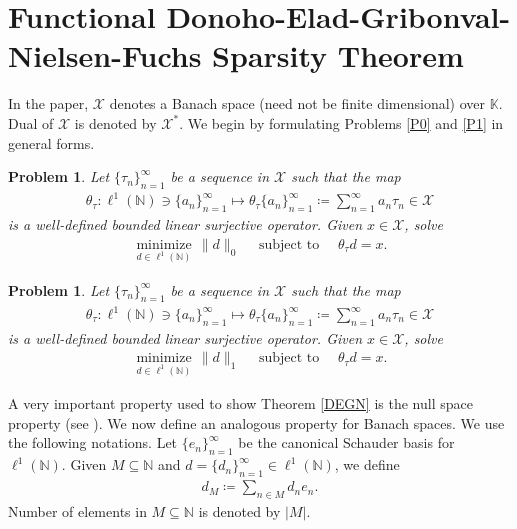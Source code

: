 \documentclass{amsart}
\newtheorem{problem}[theorem]{Problem}
\begin{document}
\section{Functional Donoho-Elad-Gribonval-Nielsen-Fuchs Sparsity Theorem}
In the paper,   $\mathcal{X}$ denotes a  Banach space (need not be finite dimensional) over $\mathbb{K}$. Dual of $\mathcal{X}$ is denoted by $\mathcal{X}^*$.
We begin by formulating  Problems \ref{P0} and \ref{P1} in general forms. 
\begin{problem} \label{BP0}
Let $\{\tau_n \}_{n=1}^\infty$ be a sequence in  $\mathcal{X}$ such that the map 
\begin{align*}
	\theta_\tau:\ell^1(\mathbb{N})\ni \{a_n \}_{n=1}^\infty\mapsto \theta_\tau \{a_n \}_{n=1}^\infty\coloneqq \sum_{n=1}^{\infty}a_n\tau_n \in \mathcal{X} 
\end{align*}
is a well-defined bounded linear surjective operator. Given $x \in \mathcal{X}$, solve 	
	\begin{align*}
	\underset{d\in \ell^1(\mathbb{N})}{\operatorname{minimize}}\,\|d\|_0 \quad \text{ subject to } \quad \theta_\tau d=x.
\end{align*}
\end{problem}
\begin{problem} \label{BP1}
	Let $\{\tau_n \}_{n=1}^\infty$ be a sequence in  $\mathcal{X}$ such that the map 
	\begin{align*}
		\theta_\tau:\ell^1(\mathbb{N})\ni \{a_n \}_{n=1}^\infty\mapsto \theta_\tau \{a_n \}_{n=1}^\infty\coloneqq \sum_{n=1}^{\infty}a_n\tau_n \in \mathcal{X} 
	\end{align*}
	is a well-defined bounded linear surjective operator. Given $x \in \mathcal{X}$, solve 	
	\begin{align*}
		\underset{d\in \ell^1(\mathbb{N})}{\operatorname{minimize}}\,\|d\|_1 \quad \text{ subject to } \quad \theta_\tau d=x.
	\end{align*}
\end{problem}
A very important property used to show Theorem \ref{DEGN} is the null space property (see \cite{KUTYNIOK, COHENDAHMENDEVORE}). We now define an analogous property for Banach spaces. We use the following notations. Let $\{e_n \}_{n=1}^\infty$ be the canonical Schauder basis for $\ell^1(\mathbb{N})$. Given $M\subseteq \mathbb{N}$ and $d=\{d_n \}_{n=1}^\infty \in \ell^1(\mathbb{N})$, we define 
\begin{align*}
	d_M\coloneqq \sum_{n\in M}d_ne_n.
\end{align*}
Number of elements in  $ M \subseteq \mathbb{N}$ is denoted by   $|M|$.
\end{document}
